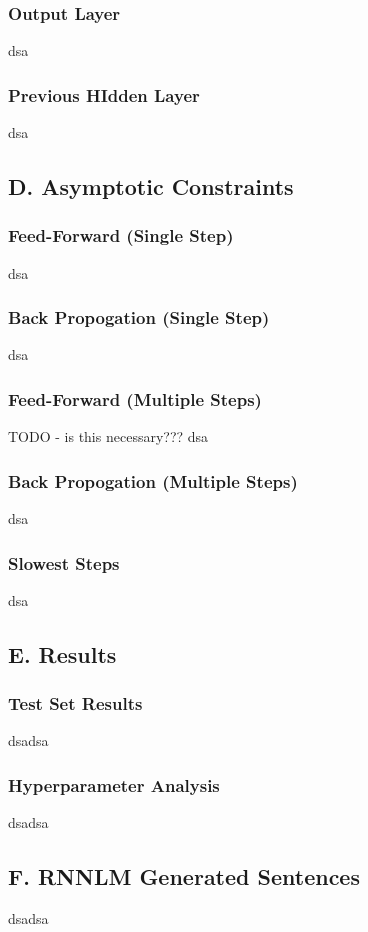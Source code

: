 \documentclass{article}
\begin{document}
\subsubsection*{Output Layer}
dsa

\subsubsection*{Previous HIdden Layer}
dsa


\subsection*{D. Asymptotic Constraints}
\subsubsection*{Feed-Forward (Single Step)}
dsa

\subsubsection*{Back Propogation (Single Step)}
dsa

\subsubsection*{Feed-Forward (Multiple Steps)}
TODO - is this necessary??? dsa

\subsubsection*{Back Propogation (Multiple Steps)}
dsa

\subsubsection*{Slowest Steps}
dsa


\subsection*{E. Results}
\subsubsection*{Test Set Results}
dsadsa

\subsubsection*{Hyperparameter Analysis}
dsadsa


\subsection*{F. \textbf{RNNLM} Generated Sentences }
dsadsa
\end{document}
